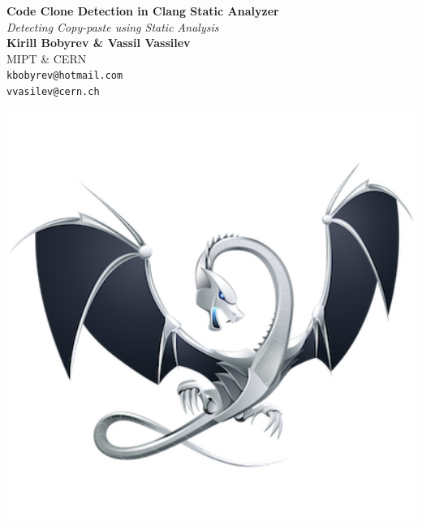 \documentclass[a0,portrait]{a0poster}
\begin{document}

\begin{minipage}[b]{0.75\linewidth}
\veryHuge \textbf{Code Clone Detection in Clang Static Analyzer} \color{Black}\\ %
\Huge\textit{Detecting Copy-paste using Static Analysis}\\[2cm] %
\huge \textbf{Kirill Bobyrev \& Vassil Vassilev}\\[0.5cm] %
\huge MIPT \& CERN\\[0.4cm] %
\Large \texttt{kbobyrev@hotmail.com}\\
\Large \texttt{vvasilev@cern.ch}\\
\end{minipage}
%
\begin{minipage}[b]{0.25\linewidth}
\includegraphics[width=20cm]{logo.png}\\
\end{minipage}

\vspace{1cm} %
\end{document}
